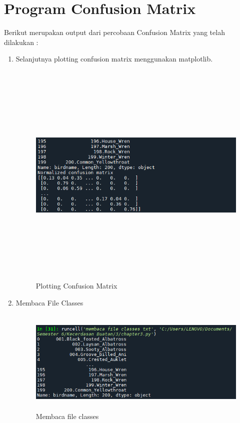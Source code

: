 \section{Program Confusion Matrix}
Berikut merupakan output dari percobaan Confusion Matrix yang telah dilakukan :
\begin{enumerate}

    \item Selanjutnya plotting confusion matrix menggunakan matplotlib.
          \begin{figure}[!htbp]
              \centering
              \includegraphics[width=11cm,height=11cm]{figures/Cp3-12.png}
              \caption{Plotting Confusion Matrix}
              \label{penanda}
          \end{figure}

    \item Membaca File Classes
          \begin{figure}[!htbp]
              \centering
              \includegraphics[width=11cm,height=5cm]{figures/Cp3-13.png}
              \caption{Membaca file classes}
              \label{penanda}
          \end{figure}


\end{enumerate}
